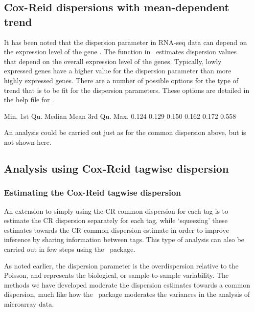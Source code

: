 \subsection{Cox-Reid dispersions with mean-dependent trend}
\label{sec:cox-reid-dispersions}

It has been noted that the dispersion parameter in RNA-seq data can
depend on the expression level of the gene \citep{Anders:2010p792}. The
function  in \edgeR~estimates
dispersion values that depend on the overall expression level of the
genes. Typically, lowly expressed genes have a higher value for the
dispersion parameter than more highly expressed genes. There are a
number of possible options for the type of trend that is to be fit for
the dispersion parameters. These options are detailed in the help file
for .

\begin{Schunk}
\begin{Soutput}
   Min. 1st Qu.  Median    Mean 3rd Qu.    Max. 
  0.124   0.129   0.150   0.162   0.172   0.558 
\end{Soutput}
\end{Schunk}

An analysis could be carried out just as for the common dispersion
above, but is not shown here.


\subsection{Analysis using Cox-Reid tagwise dispersion}


\subsubsection{Estimating the Cox-Reid tagwise dispersion}

An extension to simply using the CR common dispersion for each tag is
to estimate the CR dispersion separately for each tag, while
`squeezing' these estimates towards the CR common dispersion estimate
in order to improve inference by sharing information between
tags. This type of analysis can also be carried out in few steps using
the \edgeR~package.

As noted earlier, the dispersion parameter is the overdispersion
relative to the Poisson, and represents the biological, or
sample-to-sample variability. The methods we have developed moderate
the dispersion estimates towards a common dispersion, much like how
the \limma~package moderates the variances in the analysis of
microarray data.

